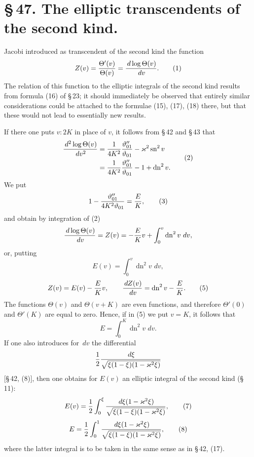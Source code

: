 \documentclass[11pt]{article}
\providecommand{\dd}{\,d}
\providecommand{\tht}{\vartheta}
\providecommand{\sn}{\operatorname{sn}}
\providecommand{\dn}{\operatorname{dn}}
\begin{document}
\section*{\S\,47. The elliptic transcendents of the second kind.}

Jacobi introduced as transcendent of the second kind the function
\begin{equation}
 Z(v)={\Theta'(v)\over\Theta(v)}={\dd\log\Theta(v)\over\dd v}.
\tag{1}
\end{equation}
The relation of this function to the elliptic integrals of the second kind results from formula (16) of \S\,23; it should immediately be observed that entirely similar considerations could be attached to the formulae (15), (17), (18) there, but that these would not lead to essentially new results.

If there one puts $v:2K$ in place of $v$, it follows from \S\,42 and \S\,43 that
\begin{equation}
\begin{aligned}
{\dd^2\log\Theta(v)\over\dd v^2}
&={1\over4K^2}{\tht_{01}''\over\tht_{01}}-\varkappa^2\sn^2v\\
&={1\over4K^2}{\tht_{01}''\over\tht_{01}}-1+\dn^2v.
\end{aligned}
\tag{2}
\end{equation}
We put
\begin{equation}
1-{\tht_{01}''\over4K^2\tht_{01}}={E\over K},
\tag{3}
\end{equation}
and obtain by integration of (2)
\[
{\dd\log\Theta(v)\over\dd v}=Z(v)=-{E\over K}v+\int_0^v\dn^2v\,\dd v,
\]
or, putting
\begin{equation}
E(v)=\int_0^v \dn^2v\,\dd v,
\tag{4}
\end{equation}
\begin{equation}
Z(v)=E(v)-{E\over K}v,
\qquad
{\dd Z(v)\over\dd v}=\dn^2v-{E\over K}.
\tag{5}
\end{equation}
The functions $\Theta(v)$ and $\Theta(v+K)$ are even functions, and therefore $\Theta'(0)$ and $\Theta'(K)$ are equal to zero. Hence, if in (5) we put $v=K$, it follows that
\begin{equation}
E=\int_0^K\dn^2v\,\dd v.
\tag{6}
\end{equation}
If one also introduces for $\dd v$ the differential
\[
{1\over2}{\dd\xi\over\sqrt{\xi(1-\xi)(1-\varkappa^2\xi)}}
\]
[\S\,42, (8)], then one obtains for $E(v)$ an elliptic integral of the second kind (\S\,11):
\begin{equation}
E(v)={1\over2}\int_0^{\xi}{\dd\xi(1-\varkappa^2\xi)\over\sqrt{\xi(1-\xi)(1-\varkappa^2\xi)}},
\tag{7}
\end{equation}
\begin{equation}
E={1\over2}\int_0^{1}{\dd\xi(1-\varkappa^2\xi)\over\sqrt{\xi(1-\xi)(1-\varkappa^2\xi)}},
\tag{8}
\end{equation}
where the latter integral is to be taken in the same sense as in \S\,42, (17).
\end{document}
